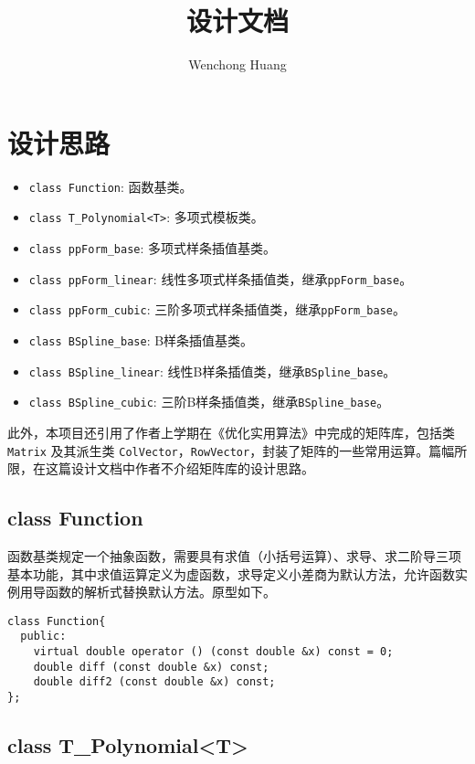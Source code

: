 \documentclass[lang=cn,11pt,a4paper]{elegantpaper}
\title{设计文档}
\author{Wenchong Huang}
\date{\zhtoday}
\begin{document}
\maketitle

\section{设计思路}

\begin{itemize}
  \item \verb|class Function|: 函数基类。
  \item \verb|class T_Polynomial<T>|: 多项式模板类。
  \item \verb|class ppForm_base|: 多项式样条插值基类。
  \item \verb|class ppForm_linear|: 线性多项式样条插值类，继承\verb|ppForm_base|。
  \item \verb|class ppForm_cubic|: 三阶多项式样条插值类，继承\verb|ppForm_base|。
  \item \verb|class BSpline_base|: B样条插值基类。
  \item \verb|class BSpline_linear|: 线性B样条插值类，继承\verb|BSpline_base|。
  \item \verb|class BSpline_cubic|: 三阶B样条插值类，继承\verb|BSpline_base|。
\end{itemize}

此外，本项目还引用了作者上学期在《优化实用算法》中完成的矩阵库，包括类 \verb|Matrix| 及其派生类 \verb|ColVector|，\verb|RowVector|，封装了矩阵的一些常用运算。篇幅所限，在这篇设计文档中作者不介绍矩阵库的设计思路。

\subsection{class Function}

函数基类规定一个抽象函数，需要具有求值（小括号运算）、求导、求二阶导三项基本功能，其中求值运算定义为虚函数，求导定义小差商为默认方法，允许函数实例用导函数的解析式替换默认方法。原型如下。

\begin{lstlisting}
class Function{
  public:
    virtual double operator () (const double &x) const = 0;
    double diff (const double &x) const;
    double diff2 (const double &x) const;
};
\end{lstlisting}

\subsection{class T\_Polynomial<T>}
\end{document}
